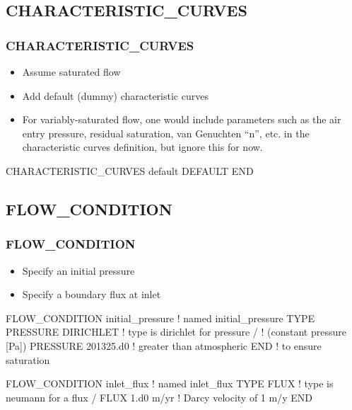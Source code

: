 \documentclass{beamer}
\newcommand\gehcomment[1]{{{\color{orange} #1}}}
\newcommand\redcomment[1]{{{\color{red} #1}}}
\newcommand\bluecomment[1]{{{\color{blue} #1}}}
\newcommand\greencomment[1]{{{\color{green} #1}}}
\begin{document}
\subsection{CHARACTERISTIC\_CURVES}

\begin{frame}[fragile]\frametitle{CHARACTERISTIC\_CURVES}

\begin{itemize}
\item Assume saturated flow
\item Add default (dummy) characteristic curves
\item For variably-saturated flow, one would include parameters such as the air entry pressure, residual saturation, van Genuchten ``n'', etc. in the characteristic curves definition, \gehcomment{but ignore this for now}.
\end{itemize}

\begin{semiverbatim}

CHARACTERISTIC_CURVES default
  DEFAULT
END
\end{semiverbatim}

\end{frame}

\subsection{FLOW\_CONDITION}

\begin{frame}[fragile]\frametitle{FLOW\_CONDITION}

\begin{itemize}
\item Specify an initial pressure
\item Specify a boundary flux at inlet
\end{itemize}

\begin{semiverbatim}
FLOW_CONDITION initial_pressure \bluecomment{! named \greencomment{initial_pressure}}
  TYPE
    PRESSURE DIRICHLET   \bluecomment{! type is \redcomment{dirichlet} for pressure}
  /                      \bluecomment{!   (constant pressure [Pa])}
  PRESSURE 201325.d0     \bluecomment{! greater than atmospheric}
END                      \bluecomment{!   to ensure saturation}

FLOW_CONDITION inlet_flux \bluecomment{! named \greencomment{inlet_flux}}
  TYPE
    FLUX           \bluecomment{! type is \redcomment{neumann} for a flux}
  /
  FLUX 1.d0 m/yr          \bluecomment{! Darcy velocity of 1 m/y}
END
\end{semiverbatim}

\end{frame}
\end{document}
